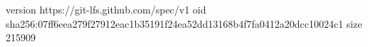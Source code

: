 version https://git-lfs.github.com/spec/v1
oid sha256:07ff6eea279f27912eac1b35191f24ea52dd13168b4f7fa0412a20dcc10024c1
size 215909
